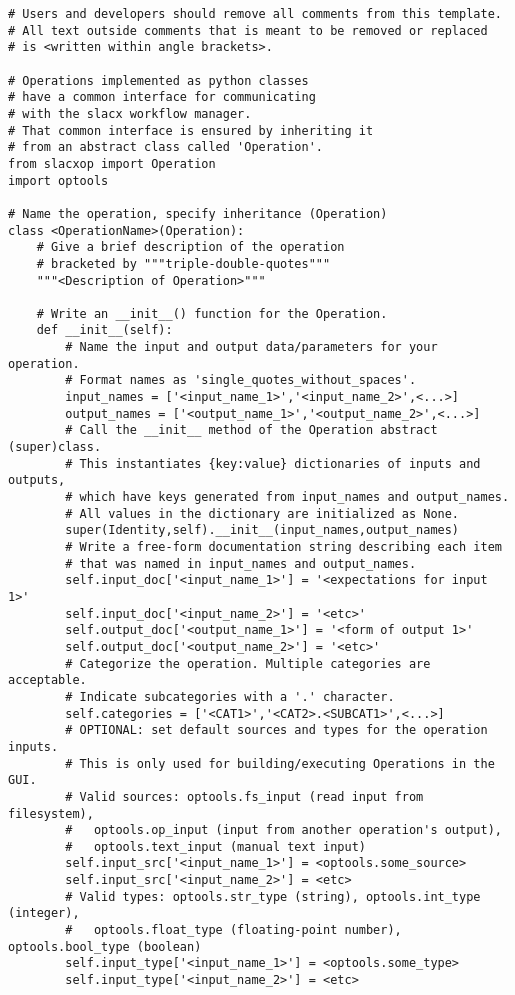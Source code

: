 \lstset{language=Python}
\begin{lstlisting}
# Users and developers should remove all comments from this template.
# All text outside comments that is meant to be removed or replaced 
# is <written within angle brackets>.

# Operations implemented as python classes 
# have a common interface for communicating 
# with the slacx workflow manager.
# That common interface is ensured by inheriting it
# from an abstract class called 'Operation'.
from slacxop import Operation
import optools

# Name the operation, specify inheritance (Operation)
class <OperationName>(Operation):
    # Give a brief description of the operation
    # bracketed by """triple-double-quotes"""
    """<Description of Operation>"""

    # Write an __init__() function for the Operation.
    def __init__(self):
        # Name the input and output data/parameters for your operation.
        # Format names as 'single_quotes_without_spaces'.
        input_names = ['<input_name_1>','<input_name_2>',<...>]
        output_names = ['<output_name_1>','<output_name_2>',<...>]
        # Call the __init__ method of the Operation abstract (super)class.
        # This instantiates {key:value} dictionaries of inputs and outputs, 
        # which have keys generated from input_names and output_names.
        # All values in the dictionary are initialized as None. 
        super(Identity,self).__init__(input_names,output_names)
        # Write a free-form documentation string describing each item
        # that was named in input_names and output_names.
        self.input_doc['<input_name_1>'] = '<expectations for input 1>'
        self.input_doc['<input_name_2>'] = '<etc>'
        self.output_doc['<output_name_1>'] = '<form of output 1>'
        self.output_doc['<output_name_2>'] = '<etc>'
        # Categorize the operation. Multiple categories are acceptable.
        # Indicate subcategories with a '.' character.
        self.categories = ['<CAT1>','<CAT2>.<SUBCAT1>',<...>]
        # OPTIONAL: set default sources and types for the operation inputs.
        # This is only used for building/executing Operations in the GUI.
        # Valid sources: optools.fs_input (read input from filesystem), 
        #   optools.op_input (input from another operation's output), 
        #   optools.text_input (manual text input)
        self.input_src['<input_name_1>'] = <optools.some_source>
        self.input_src['<input_name_2>'] = <etc>
        # Valid types: optools.str_type (string), optools.int_type (integer),
        #   optools.float_type (floating-point number), optools.bool_type (boolean)
        self.input_type['<input_name_1>'] = <optools.some_type>
        self.input_type['<input_name_2>'] = <etc>
        

\end{lstlisting}
